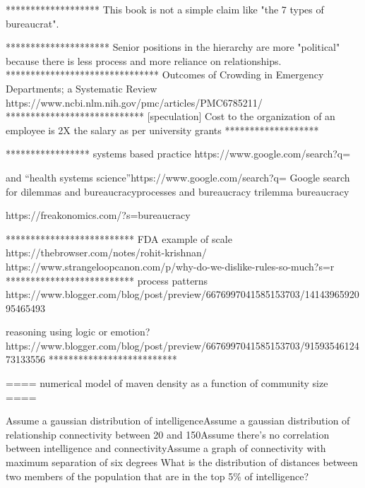 *******************
This book is not a simple claim like "the 7 types of bureaucrat". 

*********************
Senior positions in the hierarchy are more "political" because there is less process and more reliance on relationships.
*******************************
Outcomes of Crowding in Emergency Departments; a Systematic Review
https://www.ncbi.nlm.nih.gov/pmc/articles/PMC6785211/ 
****************************
[speculation] Cost to the organization of an employee is 2X the salary as per university grants
*******************

*****************
systems based practice 
https://www.google.com/search?q=%

and “health systems science”https://www.google.com/search?q=%
Google search for dilemmas and bureaucracyprocesses and bureaucracy
trilemma bureaucracy

https://freakonomics.com/?s=bureaucracy

**************************
FDA example of scale
https://thebrowser.com/notes/rohit-krishnan/
https://www.strangeloopcanon.com/p/why-do-we-dislike-rules-so-much?s=r
**************************
process patterns
https://www.blogger.com/blog/post/preview/6676997041585153703/1414396592095465493

reasoning using logic or emotion?
https://www.blogger.com/blog/post/preview/6676997041585153703/9159354612473133556
**************************

==== numerical model of maven density as a function of community size ====

Assume a gaussian distribution of intelligenceAssume a gaussian distribution of relationship connectivity between 20 and 150Assume there's no correlation between intelligence and connectivityAssume a graph of connectivity with maximum separation of six degrees
What is the distribution of distances between two members of the population that are in the top 5\% of intelligence?
